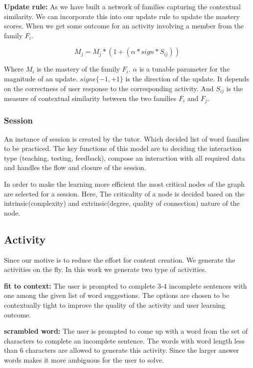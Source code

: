 \documentclass[11pt,a4paper]{article}
\begin{document}
\textbf{Update rule:} As we have built a network of families capturing the
contextual similarity. We can incorporate this into our update rule to update
the mastery scores. When we get some outcome for an activity involving a member
from the family ${F_i}$.

\begin{equation}
  M_j = M_j * (1 + (\alpha * sign * S_{ij}))
\end{equation}

Where ${M_i}$ is the mastery of the family ${F_i}$. ${\alpha}$ is a tunable parameter
for the magnitude of an update. ${sign \epsilon \{-1, +1\}}$ is the direction 
of the update. It depends on the correctness of user response to the corresponding
activity. And ${S_{ij}}$ is the measure of contextual similarity between the two
families ${F_i}$ and ${F_j}$.

\subsubsection{Session}
An instance of session is created by the tutor. Which decided list of word
families to be practiced. The key functions of this model are to deciding the
interaction type (teaching, testing, feedback), compose an interaction with all
required data and handles the flow and closure of the session.

In order to make the learning more efficient the most critical nodes of the
graph are selected for a session. Here, The criticality of a node is decided
based on the intrinsic(complexity) and extrinsic(degree, quality of connection)
nature of the node.


\subsection{Activity}
Since our motive is to reduce the effort for content creation. We generate the
activities on the fly. In this work we generate two type of activities. 

\textbf{fit to context:} The user is prompted to complete 3-4 incomplete
sentences with one among the given list of word suggestions. The options are
chosen to be contextually tight to improve the quality of the activity and
user learning outcome.

\textbf{scrambled word:} The user is prompted to come up with a word from the
set of characters to complete an incomplete sentence. The words with word length
less than 6 characters are allowed to generate this activity. Since the larger
answer words makes it more ambiguous for the user to solve.
\end{document}
